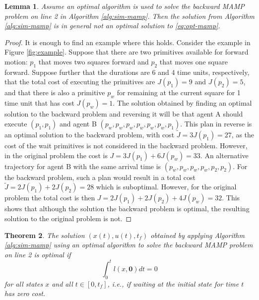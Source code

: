 \documentclass[letterpaper, 10 pt, conference]{ieeeconf}  %
\newtheorem{theorem}{Theorem}
\newtheorem{lemma}[theorem]{Lemma}
\begin{document}
\begin{lemma}
Assume an optimal algorithm is used to solve the backward MAMP problem on line 2 in Algorithm \ref{alg:sim-mamp}. Then the solution from Algorithm \ref{alg:sim-mamp} is in general not an optimal solution to \eqref{eq:opt-mamp}.
\end{lemma}

\begin{proof}
It is enough to find an example where this holds. Consider the example in Figure \ref{fig:example}. Suppose that there are two primitives available for forward motion: $p_1$ that moves two squares forward and $p_2$ that moves one square forward. Suppose further that the durations are 6 and 4 time units, respectively, that the total cost of executing the primitives are $J(p_1) = 9$ and $J(p_2) = 5$, and that there is also a primitive $p_w$ for remaining at the current square for 1 time unit that has cost $J(p_w) = 1$.
The solution obtained by finding an optimal solution to the backward problem and reversing it will be that agent A should execute $(p_1, p_1)$ and agent B $(p_w, p_w, p_w, p_w, p_w, p_w, p_1)$. This plan in reverse is an optimal solution to the backward problem, with cost $\tilde{J} = 3J(p_1) = 27$, as the cost of the wait primitives is not considered in the backward problem. However, in the original problem the cost is $J = 3J(p_1) + 6 J(p_w) = 33$. An alternative trajectory for agent B with the same arrival time is $(p_w, p_w, p_w, p_w, p_2, p_2)$. For the backward problem, such a plan would result in a total cost $\tilde{J}=2J(p_1)+2J(p_2)=28$ which is suboptimal. However, for the original problem the total cost is then $J = 2J(p_1) + 2 J(p_2) + 4 J(p_w) = 32$. This shows that although the solution the backward problem is optimal, the resulting solution to the original problem is not.
\end{proof}

\begin{theorem}
\label{th:optimality}
The solution $(x(t), u(t), t_f)$ obtained by applying Algorithm \ref{alg:sim-mamp} using an optimal algorithm to solve the backward MAMP problem  on line 2 is optimal if
\begin{equation}
\int_{0}^{t} l(x, \mathbf{0}) dt = 0
\end{equation}
\noindent for all states $x$ and all $t \in [0, t_f]$, i.e., if waiting at the initial state for time $t$ has zero cost.
\end{theorem}
\end{document}
